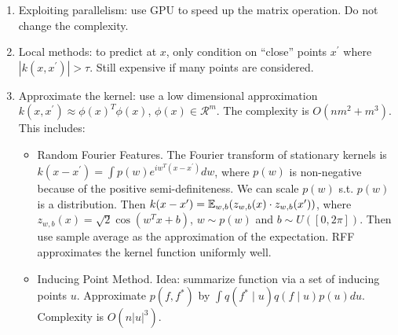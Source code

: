\begin{enumerate}
    \item Exploiting parallelism: use GPU to speed up the matrix operation. Do not change the complexity.
    \item Local methods: to predict at $x$, only condition on ``close'' points $x^\prime$ where $|k(x,x^\prime)|>\tau$. Still expensive if many points are considered.
    \item Approximate the kernel: use a low dimensional approximation $k(x,x^\prime)\approx \phi(x)^T \phi(x)$, $\phi(x)\in \mathcal{R}^m$. The complexity is $O(nm^2+m^3)$. This includes:
    \begin{itemize}
        \item Random Fourier Features. The Fourier transform of stationary kernels is $k(x-x^\prime) = \int p(w)e^{iw^T(x-x^\prime)} dw$, where $p(w)$ is non-negative because of the positive semi-definiteness. We can scale $p(w)$ s.t. $p(w)$ is a distribution. Then $k(x-x^\prime) = \mathbb{E}_{w,b} (z_{w,b}(x)\cdot z_{w,b}(x^\prime))$, where $z_{w,b}(x)=\sqrt{2}\cos(w^Tx+b)$, $w\sim p(w)$ and $b\sim U([0,2\pi])$. Then use sample average as the approximation of the expectation. RFF approximates the kernel function uniformly well.
        \item Inducing Point Method. Idea: summarize function via a set of inducing points $u$. Approximate $p(f, f^*)$ by $\int q(f^*\mid u)q(f\mid u)p(u) du$. Complexity is $O(n|u|^3)$.
    \end{itemize}
\end{enumerate}